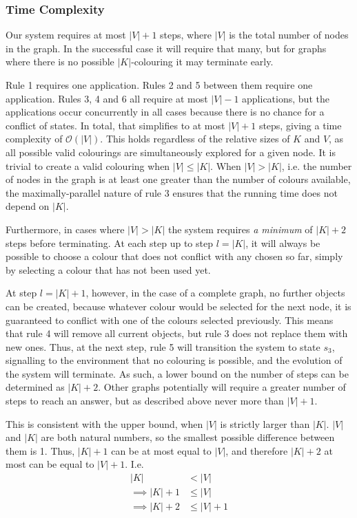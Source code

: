 \subsubsection{Time Complexity}
Our system requires at most \(|V| + 1\) steps, where \(|V|\) is the total number of nodes in the graph.  In the successful case it will require that many, but for graphs where there is no possible \(|K|\)-colouring it may terminate early.

Rule 1 requires one application.  Rules 2 and 5 between them require one application.  Rules 3, 4 and 6 all require at most \(|V|-1\) applications, but the applications occur concurrently in all cases because there is no chance for a conflict of states.  In total, that simplifies to at most \(|V| + 1\) steps, giving a time complexity of \(\mathcal{O}(|V|)\).  This holds regardless of the relative sizes of \(K\) and \(V\), as all possible valid colourings are simultaneously explored for a given node.  It is trivial to create a valid colouring when \(|V| \leq |K|\).   When \(|V| > |K|\), i.e. the number of nodes in the graph is at least one greater than the number of colours available, the maximally-parallel nature of rule 3 ensures that the running time does not depend on \(|K|\).

Furthermore, in cases where \(|V| > |K|\) the system requires \emph{a minimum} of \(|K| + 2\) steps before terminating.  At each step up to step \(l = |K|\), it will always be possible to choose a colour that does not conflict with any chosen so far, simply by selecting a colour that has not been used yet.  

At step \(l = |K| + 1\), however, in the case of a complete graph, no further \bo{} objects can be created, because whatever colour would be selected for the next node, it is guaranteed to conflict with one of the colours selected previously.  This means that rule 4 will remove all current \bo{} objects, but rule 3 does not replace them with new ones.  Thus, at the next step, rule 5 will transition the system to state \(s_3\), signalling to the environment that no colouring is possible, and the evolution of the system will terminate.  As such, a lower bound on the number of steps can be determined as \(|K| + 2\).  Other graphs potentially will require a greater number of steps to reach an answer, but as described above never more than \(|V| + 1\).

This is consistent with the upper bound, when \(|V|\) is strictly larger than \(|K|\).  \(|V|\) and \(|K|\) are both natural numbers, so the smallest possible difference between them is 1.  Thus, \(|K| + 1\) can be at most equal to \(|V|\), and therefore \(|K| + 2\) at most can be equal to \(|V| + 1\).  I.e.
\begin{align*}
    |K| &< |V|\\
    \implies |K| + 1 &\leq |V|\\
    \implies |K| + 2 &\leq |V| + 1
\end{align*}

